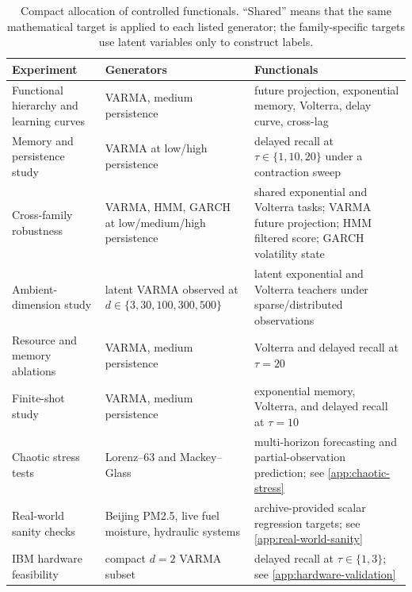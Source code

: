 \begin{table}[H]
\centering
\small
\caption{Compact allocation of controlled functionals.  ``Shared'' means that
the same mathematical target is applied to each listed generator; the
family-specific targets use latent variables only to construct labels.}
\label{tab:functional-allocation}
\begin{tabularx}{\linewidth}{@{}lXX@{}}
\toprule
Experiment & Generators & Functionals \\
\midrule
Functional hierarchy and learning curves
  & VARMA, medium persistence
  & future projection, exponential memory, Volterra, delay curve, cross-lag \\
Memory and persistence study
  & VARMA at low/high persistence
  & delayed recall at \(\tau\in\{1,10,20\}\) under a contraction sweep \\
Cross-family robustness
  & VARMA, HMM, GARCH at low/medium/high persistence
  & shared exponential and Volterra tasks; VARMA future projection; HMM filtered score; GARCH volatility state \\
Ambient-dimension study
  & latent VARMA observed at \(d\in\{3,30,100,300,500\}\)
  & latent exponential and Volterra teachers under sparse/distributed observations \\
Resource and memory ablations
  & VARMA, medium persistence
  & Volterra and delayed recall at \(\tau=20\) \\
Finite-shot study
  & VARMA, medium persistence
  & exponential memory, Volterra, and delayed recall at \(\tau=10\) \\
Chaotic stress tests
  & Lorenz--63 and Mackey--Glass
  & multi-horizon forecasting and partial-observation prediction; see \cref{app:chaotic-stress} \\
Real-world sanity checks
  & Beijing PM2.5, live fuel moisture, hydraulic systems
  & archive-provided scalar regression targets; see \cref{app:real-world-sanity} \\
IBM hardware feasibility
  & compact \(d=2\) VARMA subset
  & delayed recall at \(\tau\in\{1,3\}\); see \cref{app:hardware-validation} \\
\bottomrule
\end{tabularx}
\end{table}
